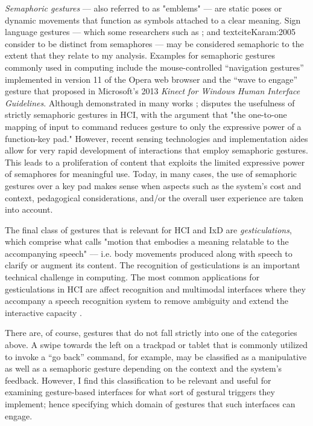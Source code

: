 \emph{Semaphoric gestures} --- also referred to as "emblems" \textcite{McNeill:2008} --- are static poses or dynamic movements that function as symbols attached to a clear meaning. Sign language gestures --- which some researchers such as \textcite{McNeill:2008}; and textcite{Karam:2005} consider to be distinct from semaphores --- may be considered semaphoric to the extent that they relate to my analysis. Examples for semaphoric gestures commonly used in computing include the mouse-controlled “navigation gestures” implemented in version 11 of the Opera web browser and the “wave to engage” gesture that proposed in Microsoft's 2013 \emph{Kinect for Windows Human Interface Guidelines}.
Although demonstrated in many works \parencite{Cao:2003, Lenman:2002, Wilson:2003}; \textcite{Wexelblat:1995} disputes the usefulness of strictly semaphoric gestures in HCI, with the argument that "the one-to-one mapping of input to command reduces gesture to only the expressive power of a function-key pad." However, recent sensing technologies and implementation aides allow for very rapid development of interactions that employ semaphoric gestures. This leads to a proliferation of content that exploits the limited expressive power of semaphores for meaningful use. Today, in many cases, the use of semaphoric gestures over a key pad makes sense when aspects such as the system's cost and context, pedagogical considerations, and/or the overall user experience \parencite{Fogtmann:2008} are taken into account.

The final class of gestures that is relevant for HCI and IxD are \emph{gesticulations}, which comprise what \textcite{McNeill:2008} calls "motion that embodies a meaning relatable to the accompanying speech" --– i.e. body movements produced along with speech to clarify or augment its content. The recognition of gesticulations is an important technical challenge in computing. The most common applications for gesticulations in HCI are affect recognition and multimodal interfaces where they accompany a speech recognition system to remove ambiguity and extend the interactive capacity \parencite{Kopp:2004, Krum:2002, Silva:2003}.

There are, of course, gestures that do not fall strictly into one of the categories above. A swipe towards the left on a trackpad or tablet that is commonly utilized to invoke a “go back” command, for example, may be classified as a manipulative as well as a semaphoric gesture depending on the context and the system’s feedback. However, I find this classification to be relevant and useful for examining gesture-based interfaces for what sort of gestural triggers they implement; hence specifying which domain of gestures that such interfaces can engage.

